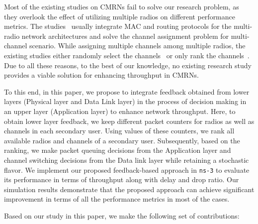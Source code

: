 Most of the existing studies on CMRNs fail to solve our research problem, as they overlook the effect of utilizing multiple radios on different performance metrics. The studies~\cite{de2012survey, feng2009joint, zhong2014capacity, li2014deterministic} usually integrate MAC and routing protocols for the multi-radio network architectures and solve the channel assignment problem for multi-channel scenario. While assigning multiple channels among multiple radios, the existing studies either randomly select the channels~\cite{khan2015towards} or only rank the channels~\cite{zhong2014capacity}. Due to all these reasons, to the best of our knowledge, no existing research study provides a viable solution for enhancing throughput in CMRNs.

To this end, in this paper, we propose to integrate feedback obtained from lower layers (Physical layer and Data Link layer) in the process of decision making in an upper layer (Application layer) to enhance network throughput. Here, to obtain lower layer feedback, we keep different packet counters for radios as well as channels in each secondary user. Using values of these counters, we rank all available radios and channels of a secondary user. Subsequently, based on the ranking, we make packet queuing decisions from the Application layer and channel switching decisions from the Data link layer while retaining a stochastic flavor. We implement our proposed feedback-based approach in \texttt{ns-3} to evaluate its performance in terms of throughput along with delay and drop ratio. Our simulation results demonstrate that the proposed approach can achieve significant improvement in terms of all the performance metrics in most of the cases.



Based on our study in this paper, we make the following set of contributions:

